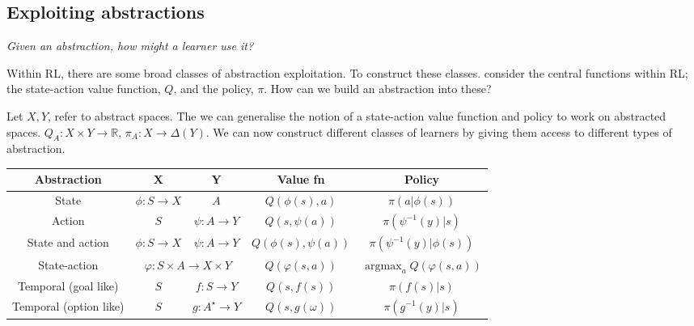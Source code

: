 \subsection{Exploiting abstractions}

%

\begin{displayquote}
\textit{Given an abstraction, how might a learner use it?}
\end{displayquote}

Within RL, there are some broad classes of abstraction exploitation. To construct these classes.
consider the central functions within RL; the state-action value function, $Q$, and the policy, $\pi$.
How can we build an abstraction into these?

Let $X, Y$, refer to abstract spaces. The we can generalise the notion of a state-action value function and policy to work on abstracted spaces.
$Q_A: X \times Y \to \mathbb R$, $\pi_A: X \to \Delta(Y)$. We can now construct
different classes of learners by giving them access to different types of abstraction.

\begin{changemargin}{-2cm}{-2cm}
  \begin{center}
    \begin{tabular}{ c || c | c | c | c }
      Abstraction & \textbf{X} & \textbf{Y} & \textbf{Value fn} & \textbf{Policy} \\ \hline \hline
      State & $\phi: S \to X$ & $A$ & $Q(\phi(s), a)$ & $\pi(a| \phi(s))$ \\ \hline
      Action & $S$ & $\psi: A \to Y$ & $Q(s, \psi(a))$ & $\pi(\psi^{-1}(y) | s)$\\ \hline
      State and action \footnotemark[5] & $\phi: S \to X$ & $\psi: A \to Y$ & $Q(\phi(s), \psi(a))$ & $\pi(\psi^{-1}(y) | \phi(s))$ \\ \hline
      State-action & \multicolumn{2}{c|}{$\varphi: S\times A \to X\times Y$} & $Q(\varphi(s, a))$ & $\mathop{\text{argmax}}_a Q(\varphi(s, a))$ \\ \hline
      Temporal (goal like)\footnotemark[10] & $S$ & $f: S \to Y$ & $Q(s, f(s))$ &  $\pi(f(s)|s)$ \\ \hline
      Temporal (option like) & $S$ & $g: A^{\star} \to Y$ & $Q(s, g(\omega))$ & $\pi(g^{-1}(y) | s)$ \\ \hline
    \end{tabular}
  \end{center}
\end{changemargin}

